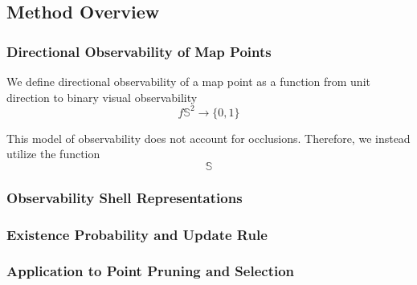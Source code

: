 \subsection{Method Overview}

\subsubsection{Directional Observability of Map Points}


We define directional observability of a map point as a function from unit direction to binary visual observability
$$
    f\mathbb{S}^2\rightarrow\{0,1\}
$$


This model of observability does not account for occlusions. Therefore, we instead utilize the function
$$
    \mathbb{S}
$$



\subsubsection{Observability Shell Representations}

\subsubsection{Existence Probability and Update Rule}

\subsubsection{Application to Point Pruning and Selection}
